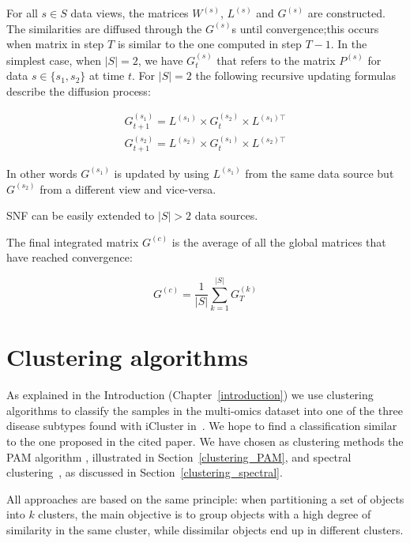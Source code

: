 For all $s\in S$ data views, the matrices $W^{(s)}$, $L^{(s)}$ and $G^{(s)}$ are constructed. The similarities are diffused through the $G^{(s)}$s until convergence;this occurs when matrix in step $T$ is similar to the one computed in step $T-1$.  
In the simplest case, when $|S|=2$, we have $G_t^{(s)}$ that refers to the matrix $P^{(s)}$ for data $s \in \{ s_1,s_2\}$ at time $t$.
For $|S|=2$ the following recursive updating formulas describe the diffusion process:

\begin{equation*}
    \begin{aligned}
        G^{(s_1)}_{t+1}=L^{(s_1)} \times G^{(s_2)}_{t} \times L^{(s_1)\top} \\
        G^{(s_2)}_{t+1}=L^{(s_2)} \times G^{(s_1)}_{t} \times L^{(s_2)\top}  
    \end{aligned}
\end{equation*}

In other words $G^{(s_1)}$ is updated by using $L^{(s_1)}$ from the same data source but $G^{(s_2)}$ from a different view and vice-versa.

SNF can be easily extended to $|S|>2$ data sources. \newline


The final integrated matrix $G^{(c)}$ is the average of all the global matrices that have reached convergence:

\begin{equation*}
    G^{(c)} = \frac{1}{|S|} \sum_{k=1}^{|S|} G_T^{(k)}
\end{equation*}


\section{Clustering algorithms}\label{methods_clustering}
As explained in the Introduction (Chapter~\ref{introduction}) we use clustering algorithms to classify the samples in the multi-omics dataset into one of the three disease subtypes found with iCluster in~\cite{shen2009integrative}. We hope to find a classification similar to the one proposed in the cited paper. We have chosen as clustering methods the PAM algorithm%
, illustrated in Section~\ref{clustering_PAM}, and spectral clustering~\cite{von2007SP}, as discussed in Section~\ref{clustering_spectral}.

All approaches are based on the same principle: when partitioning a set of objects into $k$ clusters, the main objective is to group objects with a high degree of similarity in the same cluster, while dissimilar objects end up in different clusters.

